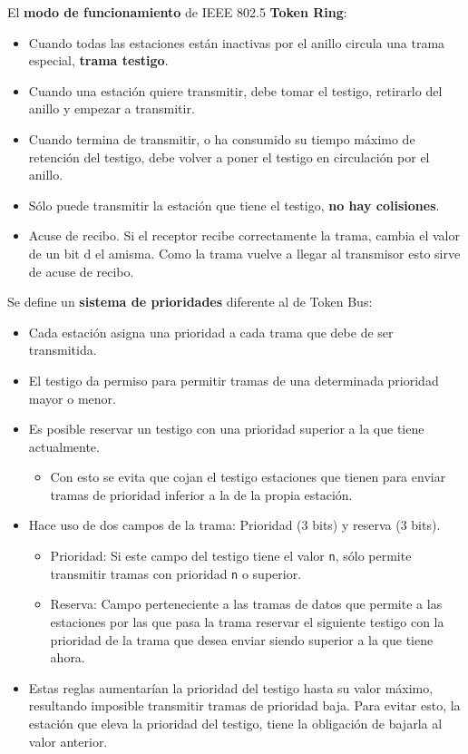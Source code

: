 \documentclass[10pt,portrait, twocolumn]{article}
\begin{document}
El \textbf{modo de funcionamiento} de IEEE 802.5 \textbf{Token Ring}:

	\begin{itemize}
		\item Cuando todas las estaciones están inactivas por el anillo circula una trama especial, \textbf{trama testigo}.
		\item Cuando una estación quiere transmitir, debe tomar el testigo, retirarlo del anillo y empezar a transmitir.
		\item Cuando termina de transmitir, o ha consumido su tiempo máximo de retención del testigo, debe volver a poner el testigo en circulación por el anillo.
		\item Sólo puede transmitir la estación que tiene el testigo, \textbf{no hay colisiones}.
		\item Acuse de recibo. Si el receptor recibe correctamente la trama, cambia el valor de un bit d el amisma. Como la trama vuelve a llegar al transmisor esto sirve de acuse de recibo.
	\end{itemize}	
	
Se define un \textbf{sistema de prioridades} diferente al de Token Bus:

	\begin{itemize}
		\item Cada estación asigna una prioridad a cada trama que debe de ser transmitida. 
		\item El testigo da permiso para permitir tramas de una determinada prioridad mayor o menor.
		\item Es posible reservar un testigo con una prioridad superior a la que tiene actualmente.
			\begin{itemize}
			\item Con esto se evita que cojan el testigo estaciones que tienen para enviar tramas de prioridad inferior a la de la propia estación.
			\end{itemize}
		\item Hace uso de dos campos de la trama: Prioridad (3 bits) y reserva (3 bits).
			\begin{itemize}
			\item Prioridad: Si este campo del testigo tiene el valor \texttt{n}, sólo permite transmitir tramas con prioridad \texttt{n} o superior.
			\item Reserva: Campo perteneciente a las tramas de datos que permite a las estaciones por las que pasa la trama reservar el siguiente testigo con la prioridad de la trama que desea enviar siendo superior a la que tiene ahora.
			\end{itemize}
		\item Estas reglas aumentarían la prioridad del testigo hasta su valor máximo, resultando imposible transmitir tramas de prioridad baja. Para evitar esto, la estación que eleva la prioridad del testigo, tiene la obligación de bajarla al valor anterior.
	\end{itemize}
	
\end{document}
